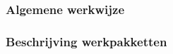 \documentclass[]{book}
\begin{document}


\subsubsection{Algemene werkwijze}


\subsubsection{Beschrijving werkpakketten}


\end{document}
